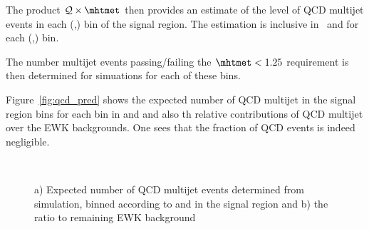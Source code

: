 The product $\mathcal{Q} \times \mhtmet$ then provides an estimate of the level of QCD multijet events in
each (\njet,\scalht) bin of the signal region. The estimation is inclusive in \nb\ and \mht for each
(\njet,\scalht) bin. 


The number multijet events passing/failing the $\mhtmet < 1.25$ requirement is then determined for simuations for each
of these bins.

Figure~\ref{fig:qcd_pred} shows the expected number of QCD multijet
 in the signal region bins for each bin in \njet and \scalht and also
th relative contributions of QCD multijet over the EWK backgrounds. One sees that the
fraction of QCD events is indeed negligible.




\begin{figure}[!h]
  \centering
   \\
  \caption{a) Expected number of QCD multijet events determined from
    simulation, binned according to \njet and \scalht in the signal region and b) the ratio to remaining EWK background }
  \label{fig:qcd_plots}
\end{figure}

